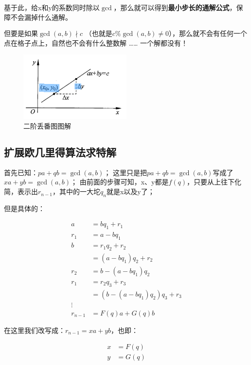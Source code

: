 \documentclass[12pt]{article}
\begin{document}
基于此，给x和y的系数同时除以$\gcd$，那么就可以得到\textbf{最小步长的通解公式}，保障不会漏掉什么通解。


但要是如果\(\gcd(a,b) \nmid c\) （也就是$c \% \gcd(a,b) \neq 0$），那么就不会有任何一个点在格子点上，自然也不会有什么整数解 …… 一个解都没有！

\begin{figure}[htb!]
    \centering
    \includegraphics[width=0.5\textwidth]{./images/二阶丢番图.png}
    \caption{二阶丢番图图解}
    \label{fig.sth}
\end{figure}

\subsection{扩展欧几里得算法求特解}

首先已知：$pa+qb=\gcd(a,b)$；
这里只是把$pa+qb=\gcd(a,b)$写成了$xa+yb=\gcd(a,b)$；
由前面的步骤可知，x、y都是$f(q)$，只要从上往下化简，表示出$r_{n-1}$，其中的一大坨$q_{n}$就是x以及y了；

但是具体的：

\begin{align}
    a &= bq_{1} + r_{1} \\
    r_{1} &= a - bq_{1} \\
    b &= r_{1}q_{2} + r_{2} \\ \nonumber &= (a - bq_{1})q_{2} + r_{2} \\
    r_{2} &= b - (a - bq_{1})q_{2}\\
    r_{1} &= r_{2}q_{3} + r_{3} \\ \nonumber &= (b - (a - bq_{1})q_{2})q_{3} + r_{3}\\
    \vdots\nonumber \\
    r_{n-1}&=F(q)a+G(q)b
\end{align}

在这里我们改写成：$r_{n-1}=xa+yb$，也即：

\begin{align*}
    x&=F(q)\\
    y&=G(q)
\end{align*}
\end{document}
